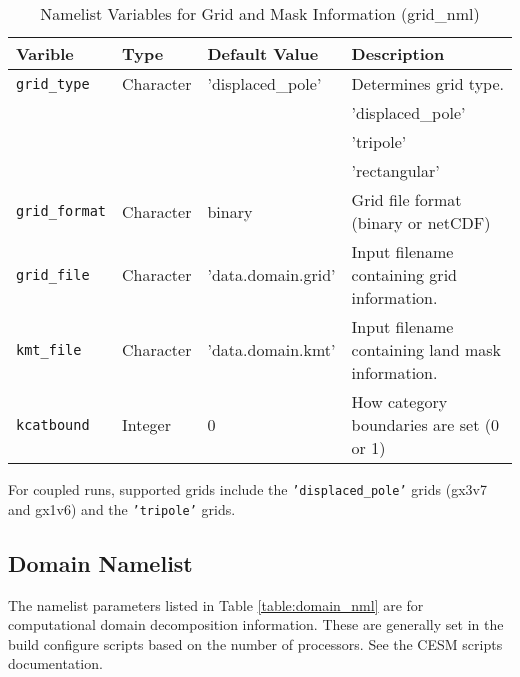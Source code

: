 \begin{table}
  \begin{center}
  \caption{Namelist Variables for Grid and Mask Information (grid_nml)}
  \label{table:grid_nml}
  \begin{tabular}{p{2.5cm}p{2.5cm}p{3cm}p{6.0cm}} \hline
  Varible & Type & Default Value & Description               \\
\hline \hline

{\tt grid\_type} &  Character & 'displaced\_pole' &  Determines grid type. \\
          &            &   &  'displaced\_pole' \\
          &            &   &  'tripole' \\
          &            &   &  'rectangular' \\

{\tt grid\_format} & Character & binary & Grid file format (binary or netCDF) \\

{\tt grid\_file} &  Character & 'data.domain.grid' &  Input filename
                                           containing grid information. \\

{\tt kmt\_file} &  Character & 'data.domain.kmt' &  Input filename
                                       containing land mask information. \\

{\tt kcatbound} & Integer & 0 & How category boundaries are set (0 or 1) \\

  \hline
  \end{tabular}
  \end{center}
\end{table}

For coupled runs, supported grids include the {\tt 'displaced\_pole'} grids 
(gx3v7 and gx1v6) and the {\tt 'tripole'} grids.

\subsection{Domain Namelist}

The namelist parameters listed in Table \ref{table:domain_nml} are for
computational domain decomposition information. These are generally set in
the build configure scripts based on the number of processors. See the CESM
scripts documentation.

